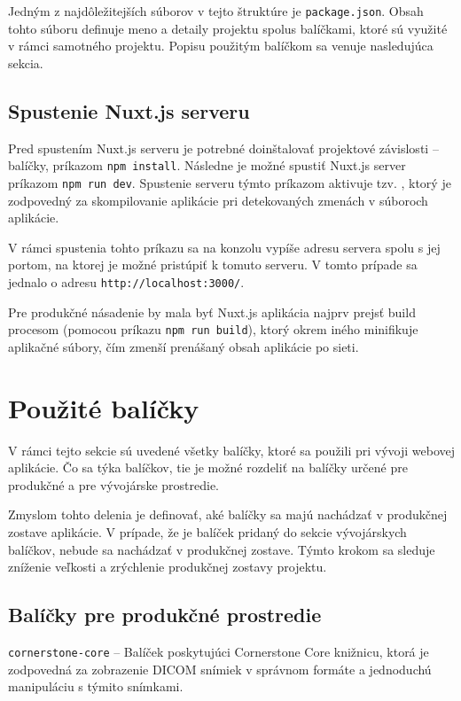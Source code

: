 Jedným z najdôležitejších súborov v tejto štruktúre je \texttt{package.json}. Obsah tohto súboru definuje meno a detaily projektu spolu\newline s balíčkami, ktoré sú využité v rámci samotného projektu. Popisu použitým balíčkom sa venuje nasledujúca sekcia.

\subsection {Spustenie Nuxt.js serveru}
Pred spustením Nuxt.js serveru je potrebné doinštalovať projektové závislosti -- balíčky, príkazom \texttt{npm install}. Následne je možné spustiť Nuxt.js server príkazom \texttt{npm run dev}. Spustenie serveru týmto príkazom aktivuje tzv. , ktorý je zodpovedný za skompilovanie aplikácie pri detekovaných zmenách v súboroch aplikácie.

V rámci spustenia tohto príkazu sa na konzolu vypíše adresu servera spolu s jej portom, na ktorej je možné pristúpiť k tomuto serveru. V tomto prípade sa jednalo o adresu \texttt{http://localhost:3000/}. 

Pre produkčné násadenie by mala byť Nuxt.js aplikácia najprv prejsť build procesom (pomocou príkazu \texttt{npm run build}), ktorý okrem iného minifikuje aplikačné súbory, čím zmenší prenášaný obsah aplikácie po sieti.

\clearpage

\section {Použité balíčky}
V rámci tejto sekcie sú uvedené všetky balíčky, ktoré sa použili pri vývoji webovej aplikácie.
Čo sa týka balíčkov, tie je možné rozdeliť na balíčky určené pre produkčné a pre vývojárske prostredie.

Zmyslom tohto delenia je definovať, aké balíčky sa majú nachádzať v produkčnej zostave aplikácie. V prípade, že je balíček pridaný do sekcie vývojárskych balíčkov, nebude sa nachádzať v produkčnej zostave. Týmto krokom sa sleduje zníženie veľkosti a zrýchlenie produkčnej zostavy projektu.

\subsection {Balíčky pre produkčné prostredie}
\texttt{cornerstone-core} -- Balíček poskytujúci Cornerstone Core knižnicu, ktorá je zodpovedná za zobrazenie DICOM snímiek v správnom formáte a jednoduchú manipuláciu s týmito snímkami.

